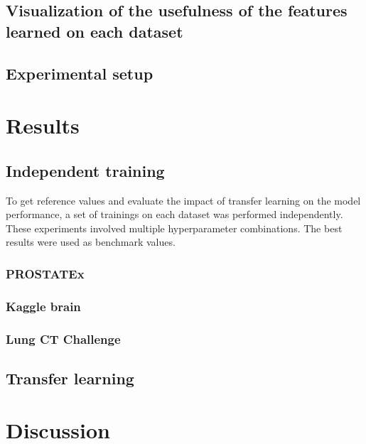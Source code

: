 \subsection{Visualization of the usefulness of the features learned on each dataset}
\subsection{Experimental setup}
\section{Results}

\subsection{Independent training}
To get reference values and evaluate the impact of transfer learning on the model performance, a set of trainings on each dataset was performed independently. These experiments involved multiple hyperparameter combinations. The best results were used as benchmark values. 

\subsubsection{PROSTATEx}

\subsubsection{Kaggle brain}

\subsubsection{Lung CT Challenge}


\subsection{Transfer learning}


\section{Discussion}